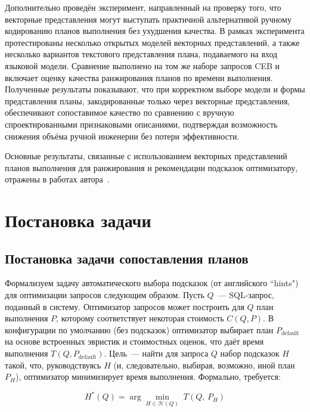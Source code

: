 Дополнительно проведён эксперимент, направленный на проверку того, что векторные представления могут выступать практичной альтернативой ручному кодированию планов выполнения без ухудшения качества. В рамках эксперимента протестированы несколько открытых моделей векторных представлений, а также несколько вариантов текстового представления плана, подаваемого на вход языковой модели. Сравнение выполнено на том же наборе запросов CEB и включает оценку качества ранжирования планов по времени выполнения. Полученные результаты показывают, что при корректном выборе модели и формы представления планы, закодированные только через векторные представления, обеспечивают сопоставимое качество по сравнению с вручную спроектированными признаковыми описаниями, подтверждая возможность снижения объёма ручной инженерии без потери эффективности. 

Основные результаты, связанные с использованием векторных представлений планов выполнения для ранжирования и рекомендации подсказок оптимизатору, отражены в работах автора~\cite{vasilenko2026plan_mapping,vasilenko_article_inpress,11289347,vasilenko2025}.

\section{Постановка задачи}\label{sec:ch3/sec2}

\subsection{Постановка задачи сопоставления планов}

Формализуем задачу автоматического выбора подсказок (от английского ``hints") для оптимизации запросов следующим образом. Пусть $Q$~--- SQL-запрос, поданный в систему. Оптимизатор запросов может построить для $Q$ план выполнения $P$, которому соответствует некоторая стоимость $C(Q, P)$. В конфигурации по умолчанию (без подсказок) оптимизатор выбирает план $P_{\text{default}}$ на основе встроенных эвристик и стоимостных оценок, что даёт время выполнения $T(Q,P_{\text{default}})$. Цель~--- найти для запроса $Q$ набор подсказок $H$ такой, что, руководствуясь $H$ (и, следовательно, выбирая, возможно, иной план $P_H$), оптимизатор минимизирует время выполнения. Формально, требуется:

\begin{equation}
    \label{eq:equation31}
    H^*(Q) = \arg\min_{H \in \mathcal{H}(Q)} \; T\left(Q,\, P_H\right)
\end{equation}

